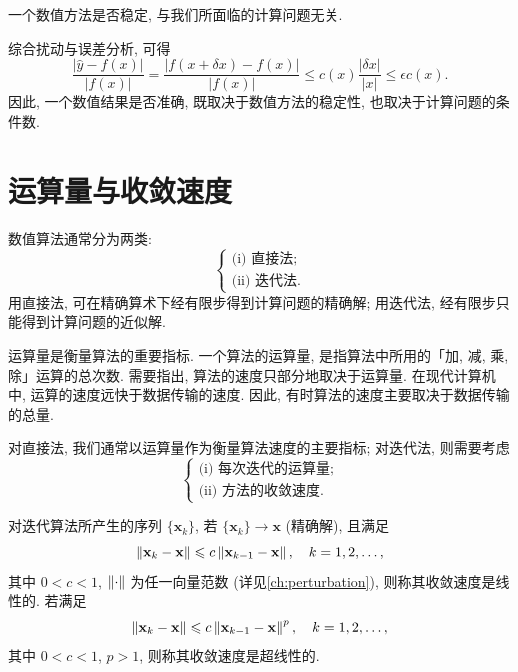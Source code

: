 \begin{mremark}
一个数值方法是否稳定, 与我们所面临的计算问题无关.
\end{mremark}

综合扰动与误差分析, 可得
\[
  \frac{|\hat{y}-f(x)|}{|f(x)|}
  =\frac{|f(x+\delta x)-f(x)|}{|f(x)|}
  \leqslant c(x)\frac{|\delta x|}{|x|}
  \leqslant \epsilon c(x).
\]
因此, 一个数值结果是否准确, 既取决于数值方法的稳定性, 也取决于计算问题的条件数.

\section{运算量与收敛速度}
\label{sec:ch1-cost}

数值算法通常分为两类:
\[
  \begin{cases}
    \text{(i) 直接法;}\\
    \text{(ii) 迭代法.}
  \end{cases}
\]
用直接法, 可在精确算术下经有限步得到计算问题的精确解; 用迭代法, 经有限步只能得到计算问题的近似解.

运算量是衡量算法的重要指标. 一个算法的运算量, 是指算法中所用的「加, 减, 乘, 除」运算的总次数. 需要指出, 算法的速度只部分地取决于运算量. 在现代计算机中, 运算的速度远快于数据传输的速度. 因此, 有时算法的速度主要取决于数据传输的总量.

对直接法, 我们通常以运算量作为衡量算法速度的主要指标; 对迭代法, 则需要考虑
\[
  \begin{cases}
    \text{(i) 每次迭代的运算量;}\\
    \text{(ii) 方法的收敛速度.}
  \end{cases}
\]

对迭代算法所产生的序列 $\{\mathbf{x}_k\}$, 若 $\{\mathbf{x}_k\}\to\mathbf{x}$ (精确解), 且满足
\[
  \left\|\mathbf{x}_k-\mathbf{x}\right\|\leqslant c\left\|\mathbf{x}_{k-1}-\mathbf{x}\right\|,\quad k=1,2,\ldots,
\]
其中 $0<c<1$, $\left\|\cdot\right\|$ 为任一向量范数 (详见\autoref{ch:perturbation}), 则称其收敛速度是线性的. 若满足
\[
  \left\|\mathbf{x}_k-\mathbf{x}\right\|\leqslant c\left\|\mathbf{x}_{k-1}-\mathbf{x}\right\|^{p},\quad k=1,2,\ldots,
\]
其中 $0<c<1$, $p>1$, 则称其收敛速度是超线性的.

